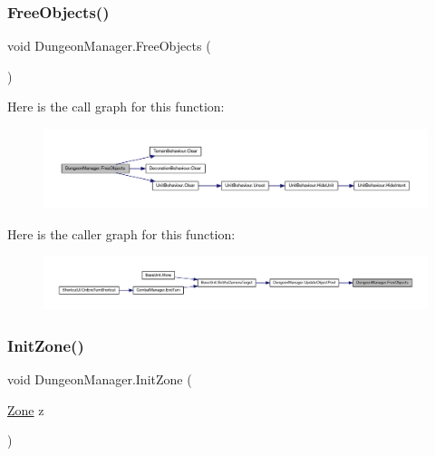 \subsubsection{\texorpdfstring{FreeObjects()}{FreeObjects()}}
{\footnotesize\ttfamily void Dungeon\+Manager.\+Free\+Objects (\begin{DoxyParamCaption}{ }\end{DoxyParamCaption})}

Here is the call graph for this function\+:
\nopagebreak
\begin{figure}[H]
\begin{center}
\leavevmode
\includegraphics[width=350pt]{class_dungeon_manager_ab7edf3b19e13892178a34ece10f4c5d5_cgraph}
\end{center}
\end{figure}
Here is the caller graph for this function\+:
\nopagebreak
\begin{figure}[H]
\begin{center}
\leavevmode
\includegraphics[width=350pt]{class_dungeon_manager_ab7edf3b19e13892178a34ece10f4c5d5_icgraph}
\end{center}
\end{figure}
\mbox{\label{class_dungeon_manager_afc7ff9dc122b876f72a4f238496f3a26}} 
\subsubsection{\texorpdfstring{InitZone()}{InitZone()}}
{\footnotesize\ttfamily void Dungeon\+Manager.\+Init\+Zone (\begin{DoxyParamCaption}\item[{\mbox{\hyperlink{class_dungeon_manager_a6558d4a01889674bf25c798f1b90a431}{Zone}}}]{z }\end{DoxyParamCaption})}

